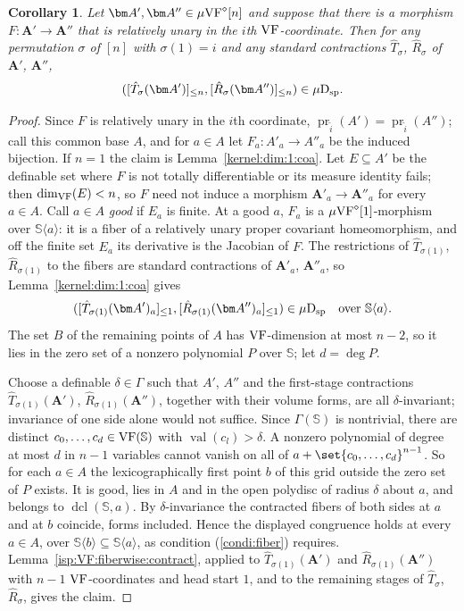 \documentclass[12pt]{amsart}
\newcommand{\memph}[1]{{\color{magenta}\emph{#1}}}
\theoremstyle{plain}
\newtheorem{cor}[thm]{Corollary}
\theoremstyle{definition}
\theoremstyle{remark}
\numberwithin{equation}{section}
\theoremstyle{plain}
\newcommand{\VF}{\textup{VF}}
\DeclareMathOperator{\dcl}{dcl}
\DeclareMathOperator{\pr}{pr}
\newcommand{\0}{\emptyset}
\newcommand{\fun}{\longrightarrow}
\newcommand{\sub}{\subseteq}
\newcommand{\la}{\langle}
\newcommand{\ra}{\rangle}
\newcommand{\mVF}{{\mu}{\VF}}
\newcommand{\dsp}{\textup{D}_{\textup{sp}}}
\newcommand{\mispdb}{\mu \dsp}
\DeclareMathOperator{\vv}{val}
\begin{document}
\begin{cor}\label{contraction:same:perm:isp}
Let $\bm A', \bm A'' \in \mVF^{\diamond}[n]$ and suppose that there is a morphism $F : \bm A' \fun \bm A''$ that is relatively unary in the $i$th $\VF$-coordinate. Then for any permutation $\sigma$ of $[n]$ with $\sigma(1) = i$ and any standard contractions $\hat T_{\sigma}$, $\hat R_{\sigma}$ of $\bm A'$, $\bm A''$,
\[
([\hat T_{\sigma}(\bm A')]_{\leq n}, [\hat R_{\sigma}(\bm A'')]_{\leq n}) \in \mispdb.
\]
\end{cor}
\begin{proof}
Since $F$ is relatively unary in the $i$th coordinate, $\pr_{\tilde i}(A') = \pr_{\tilde i}(A'')$; call this common base $A$, and for $a \in A$ let $F_a : A'_a \fun A''_a$ be the induced bijection. If $n = 1$ the claim is Lemma~\ref{kernel:dim:1:coa}. Let $E \sub A'$ be the definable set where $F$ is not totally differentiable or its measure identity fails; then $\dim_{\VF}(E) < n$, so $F$ need not induce a morphism $\bm A'_a \fun \bm A''_a$ for every $a \in A$. Call $a \in A$ \memph{good} if $E_a$ is finite. At a good $a$, $F_a$ is a $\mVF^\diamond[1]$-morphism over $\mathbb S \la a \ra$: it is a fiber of a relatively unary proper covariant homeomorphism, and off the finite set $E_a$ its derivative is the Jacobian of $F$. The restrictions of $\hat T_{\sigma(1)}$, $\hat R_{\sigma(1)}$ to the fibers are standard contractions of $\bm A'_a$, $\bm A''_a$, so Lemma~\ref{kernel:dim:1:coa} gives
\[
([\hat T_{\sigma(1)}(\bm A')_a]_{\leq 1}, [\hat R_{\sigma(1)}(\bm A'')_a]_{\leq 1}) \in \mispdb \quad \text{over } \mathbb S \la a \ra.
\]
The set $B$ of the remaining points of $A$ has $\VF$-dimension at most $n-2$, so it lies in the zero set of a nonzero polynomial $P$ over $\mathbb S$; let $d = \deg P$.

Choose a definable $\delta \in \Gamma$ such that $A'$, $A''$ and the first-stage contractions $\hat T_{\sigma(1)}(\bm A')$, $\hat R_{\sigma(1)}(\bm A'')$, together with their volume forms, are all $\delta$-invariant; invariance of one side alone would not suffice. Since $\Gamma(\mathbb S)$ is nontrivial, there are distinct $c_0, \ldots, c_d \in \VF(\mathbb S)$ with $\vv(c_l) > \delta$. A nonzero polynomial of degree at most $d$ in $n-1$ variables cannot vanish on all of $a + \set{c_0, \ldots, c_d}^{n-1}$. So for each $a \in A$ the lexicographically first point $b$ of this grid outside the zero set of $P$ exists. It is good, lies in $A$ and in the open polydisc of radius $\delta$ about $a$, and belongs to $\dcl(\mathbb S, a)$. By $\delta$-invariance the contracted fibers of both sides at $a$ and at $b$ coincide, forms included. Hence the displayed congruence holds at every $a \in A$, over $\mathbb S \la b \ra \sub \mathbb S \la a \ra$, as condition (\ref{condi:fiber}) requires. Lemma~\ref{isp:VF:fiberwise:contract}, applied to $\hat T_{\sigma(1)}(\bm A')$ and $\hat R_{\sigma(1)}(\bm A'')$ with $n-1$ $\VF$-coordinates and head start $1$, and to the remaining stages of $\hat T_\sigma$, $\hat R_\sigma$, gives the claim.


\end{proof}
\end{document}
